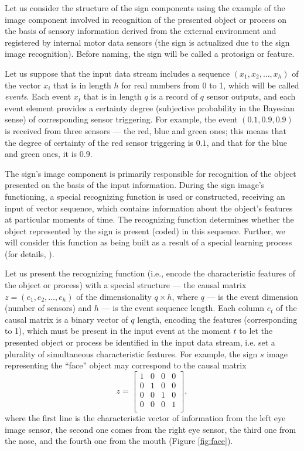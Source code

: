 \documentclass[12pt]{scrartcl}
\begin{document}
	Let us consider the structure of the sign components using the example of the image component involved in recognition of the presented object or process on the basis of sensory information derived from the external environment and registered by internal motor data sensors (the sign is actualized due to the sign image recognition). Before naming, the sign will be called a protosign or feature.
	
	Let us suppose that the input data stream includes a sequence $(x_1,x_2,\dots,x_h)$ of the vector $x_i$ that is in length $h$ for real numbers from 0 to 1, which will be called \textit{events}. Each event $x_t$ that is in length $q$ is a record of $q$ sensor outputs, and each event element provides a certainty degree (subjective probability in the Bayesian sense) of corresponding sensor triggering. For example, the event $(0.1, 0.9, 0.9)$ is received from three sensors --- the red, blue and green ones; this means that the degree of certainty of the red sensor triggering is  $0.1$, and that for the blue and green ones, it is $0.9$.
	
	The sign's image component is primarily responsible for recognition of the object presented on the basis of the input information. During the sign image's functioning, a special recognizing function is used or constructed, receiving an input of vector sequence, which contains information about the object’s features at particular moments of time. The recognizing function determines whether the object represented by the sign is present (coded) in this sequence. Further, we will consider this function as being built as a result of a special learning process (for details, \cite{Skrynnik2016}).
	
	
	Let us present the recognizing function (i.e., encode the characteristic features of the object or process) with a special structure --- the causal matrix $z=(e_1,e_2,\dots,e_h)$ of the dimensionality $q\times h$, where $q$ --- is the event dimension (number of sensors) and $h$ --- is the event sequence length. Each column $e_t$ of the causal matrix is a binary vector of $q$ length, encoding the features (corresponding to 1), which must be present in the input event at the moment $t$ to let the presented object or process be identified in the input data stream, i.e. set a plurality of simultaneous characteristic features. For example, the sign $s$ image representing the ``face'' object  may correspond to the causal matrix
	\[
		z=\begin{bmatrix}
			1 & 0 & 0 & 0\\
			0 & 1 & 0 & 0\\
			0 & 0 & 1 & 0\\
			0 & 0 & 0 & 1\\
		\end{bmatrix},
	\]
	where the first line is the characteristic vector of information from the left eye image sensor, the second one comes from the right eye sensor, the third one from the nose, and the fourth one from the mouth (Figure \ref{fig:face}).	
\end{document}
